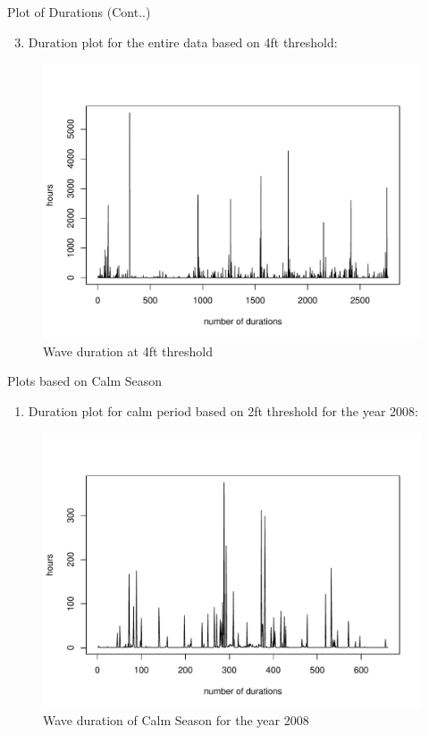 \documentclass[
  ignorenonframetext,
]{beamer}
\providecommand{\tightlist}{%
  \setlength{\itemsep}{0pt}\setlength{\parskip}{0pt}}
\begin{document}
\begin{frame}{Plot of Durations (Cont..)}
\protect\hypertarget{plot-of-durations-cont..-1}{}
\begin{enumerate}
[1)]
\setcounter{enumi}{2}
\tightlist
\item
  Duration plot for the entire data based on 4ft threshold:
\end{enumerate}

\begin{figure}
\includegraphics[width=1\linewidth]{dur_plot_4ft} \caption{Wave duration at 4ft threshold}\label{fig:4ft durations}
\end{figure}
\end{frame}

\begin{frame}{Plots based on Calm Season}
\protect\hypertarget{plots-based-on-calm-season}{}
\begin{enumerate}
[1)]
\tightlist
\item
  Duration plot for calm period based on 2ft threshold for the year
  2008:
\end{enumerate}

\begin{figure}
\includegraphics[width=1\linewidth]{Picture1} \caption{Wave duration of Calm Season for the year 2008}\label{fig:Calm Season}
\end{figure}
\end{frame}
\end{document}
